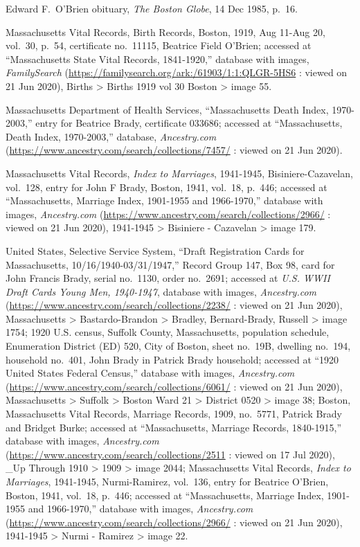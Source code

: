 \begin{thebibliography}{999}
Edward F.\ O'Brien obituary, \textit{The Boston Globe}, 14 Dec 1985, p.\ 16.


Massachusetts Vital Records, Birth Records, Boston, 1919, Aug 11-Aug 20, vol.\ 30, p.\ 54, certificate no.\ 11115, Beatrice Field O'Brien; accessed at ``Massachusetts State Vital Records, 1841-1920,'' database with images, \textit{FamilySearch} (\url{https://familysearch.org/ark:/61903/1:1:QLGR-5HS6} : viewed on 21 Jun 2020), Births > Births 1919 vol 30 Boston > image 55.

Massachusetts Department of Health Services, ``Massachusetts Death Index, 1970-2003,'' entry for Beatrice Brady, certificate 033686; accessed at ``Massachusetts, Death Index, 1970-2003,'' database, \textit{Ancestry.com} (\url{https://www.ancestry.com/search/collections/7457/} : viewed on 21 Jun 2020).

Massachusetts Vital Records, \textit{Index to Marriages}, 1941-1945, Bisiniere-Cazavelan, vol.\ 128, entry for John F Brady, Boston, 1941, vol.\ 18, p.\ 446; accessed at ``Massachusetts, Marriage Index, 1901-1955 and 1966-1970,'' database with images, \textit{Ancestry.com} (\url{https://www.ancestry.com/search/collections/2966/} : viewed on 21 Jun 2020), 1941-1945 > Bisiniere - Cazavelan > image 179.

United States, Selective Service System, ``Draft Registration Cards for Massachusetts, 10/16/1940-03/31/1947,'' Record Group 147, Box 98, card for John Francis Brady, serial no.\ 1130, order no.\ 2691; accessed at \textit{U.S. WWII Draft Cards Young Men, 1940-1947}, database with images, \textit{Ancestry.com} (\url{https://www.ancestry.com/search/collections/2238/} : viewed on 21 Jun 2020), Massachusetts >  Bastardo-Brandon > Bradley, Bernard-Brady, Russell > image 1754; 1920 U.S. census, Suffolk County, Massachusetts, population schedule, Enumeration District (ED) 520, City of Boston, sheet no.\ 19B, dwelling no.\ 194, household no.\ 401, John Brady in Patrick Brady household; accessed at ``1920 United States Federal Census,'' database with images, \textit{Ancestry.com} (\url{https://www.ancestry.com/search/collections/6061/} : viewed on 21 Jun 2020), Massachusetts > Suffolk > Boston Ward 21 > District 0520 > image 38; Boston, Massachusetts Vital Records, Marriage Records, 1909, no.\ 5771, Patrick Brady and Bridget Burke; accessed at ``Massachusetts, Marriage Records, 1840-1915,'' database with images, \textit{Ancestry.com} (\url{https://www.ancestry.com/search/collections/2511} : viewed on 17 Jul 2020), \_Up Through 1910 > 1909 > image 2044; Massachusetts Vital Records, \textit{Index to Marriages}, 1941-1945, Nurmi-Ramirez, vol.\ 136, entry for Beatrice O'Brien, Boston, 1941, vol.\ 18, p.\ 446; accessed at ``Massachusetts, Marriage Index, 1901-1955 and 1966-1970,'' database with images, \textit{Ancestry.com} (\url{https://www.ancestry.com/search/collections/2966/} : viewed on 21 Jun 2020), 1941-1945 > Nurmi - Ramirez > image 22.


\end{thebibliography}
